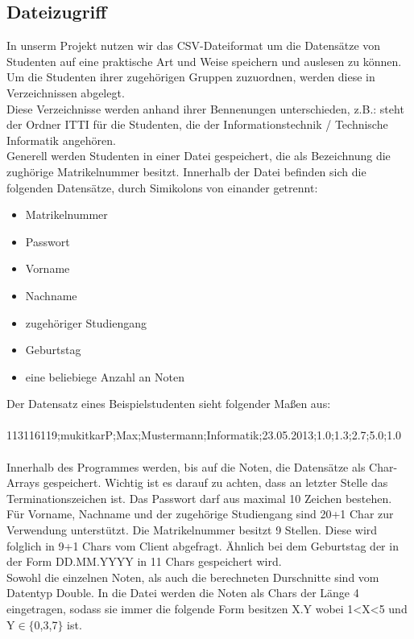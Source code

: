 \documentclass{scrartcl}
\begin{document}
	\subsection{Dateizugriff}
		In unserm Projekt nutzen wir das CSV-Dateiformat um die Datensätze von Studenten auf eine praktische Art und Weise speichern und auslesen zu können. Um die Studenten ihrer zugehörigen Gruppen zuzuordnen, werden diese in Verzeichnissen abgelegt.\\
		Diese Verzeichnisse werden anhand ihrer Bennenungen unterschieden, z.B.: steht der Ordner ITTI für die Studenten, die der Informationstechnik / Technische Informatik angehören.\\
		Generell werden Studenten in einer Datei gespeichert, die als Bezeichnung die zughörige Matrikelnummer besitzt. Innerhalb der Datei befinden sich die folgenden Datensätze, durch Simikolons von einander getrennt:\\
		\begin{itemize}
			\item Matrikelnummer
			\item Passwort
			\item Vorname
			\item Nachname
			\item zugehöriger Studiengang
			\item Geburtstag
			\item eine beliebiege Anzahl an Noten
		\end{itemize}
		Der Datensatz eines Beispielstudenten sieht folgender Maßen aus:\\
		 \\
		113116119;mukitkarP;Max;Mustermann;Informatik;23.05.2013;1.0;1.3;2.7;5.0;1.0\\
		 \\
		Innerhalb des Programmes werden, bis auf die Noten, die Datensätze als Char-Arrays gespeichert. Wichtig ist es darauf zu achten, dass an letzter Stelle das Terminationszeichen ist. Das Passwort darf aus maximal 10 Zeichen bestehen. Für Vorname, Nachname und der zugehörige Studiengang sind 20+1 Char zur Verwendung unterstützt. Die Matrikelnummer besitzt 9 Stellen. Diese wird folglich in 9+1 Chars vom Client abgefragt. Ähnlich bei dem Geburtstag der in der Form DD.MM.YYYY in 11 Chars gespeichert wird. \\
		Sowohl die einzelnen Noten, als auch die berechneten Durschnitte sind vom Datentyp Double. In die Datei werden die Noten als Chars der Länge 4 eingetragen, sodass sie immer die folgende Form besitzen X.Y wobei 1<X<5 und Y$\in \{$0,3,7$\}$ ist.\\
\end{document}
